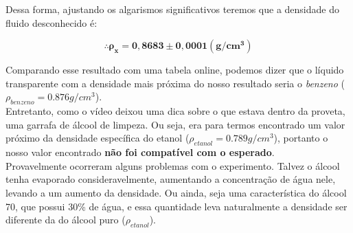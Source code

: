 Dessa forma, ajustando os algarismos significativos teremos que a densidade do fluido desconhecido é:

\[ \mathbf{\therefore \rho _x = 0,8683 \pm 0,0001 (g/cm^3)} \]

Comparando esse resultado com uma tabela online, podemos dizer que o líquido transparente com a densidade mais próxima do nosso resultado seria o \textit{benzeno} ($\rho _{benzeno} = 0.876 g/cm^3$).\\

Entretanto, como o vídeo deixou uma dica sobre o que estava dentro da proveta, uma garrafa de álcool de limpeza. Ou seja, era para termos encontrado um valor próximo da densidade específica do etanol ($\rho _{etanol} = 0.789 g/cm^3$), portanto o nosso valor encontrado \textbf{não foi compatível com o esperado}.\\

Provavelmente ocorreram alguns problemas com o experimento. Talvez o álcool tenha evaporado consideravelmente, aumentando a concentração de água nele, levando a um aumento da densidade. Ou ainda, seja uma característica do álcool 70, que possui 30\% de água, e essa quantidade leva naturalmente a densidade ser diferente da do álcool puro ($\rho _{etanol}$).
